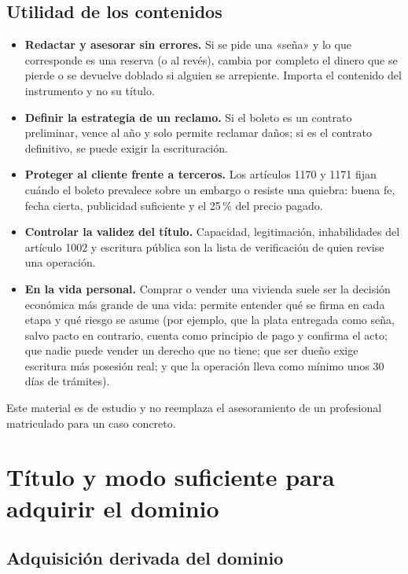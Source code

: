 \documentclass[12pt,oneside]{book}
\begin{document}
\section*{Utilidad de los contenidos}

\begin{itemize}
    \item \textbf{Redactar y asesorar sin errores.} Si se pide una «seña» y lo que corresponde es una reserva (o al revés), cambia por completo el dinero que se pierde o se devuelve doblado si alguien se arrepiente. Importa el contenido del instrumento y no su título.
    \item \textbf{Definir la estrategia de un reclamo.} Si el boleto es un contrato preliminar, vence al año y solo permite reclamar daños; si es el contrato definitivo, se puede exigir la escrituración.
    \item \textbf{Proteger al cliente frente a terceros.} Los artículos 1170 y 1171 fijan cuándo el boleto prevalece sobre un embargo o resiste una quiebra: buena fe, fecha cierta, publicidad suficiente y el 25\,\% del precio pagado.
    \item \textbf{Controlar la validez del título.} Capacidad, legitimación, inhabilidades del artículo 1002 y escritura pública son la lista de verificación de quien revise una operación.
    \item \textbf{En la vida personal.} Comprar o vender una vivienda suele ser la decisión económica más grande de una vida: permite entender qué se firma en cada etapa y qué riesgo se asume (por ejemplo, que la plata entregada como seña, salvo pacto en contrario, cuenta como principio de pago y confirma el acto; que nadie puede vender un derecho que no tiene; que ser dueño exige escritura más posesión real; y que la operación lleva como mínimo unos 30 días de trámites).
\end{itemize}

\begin{note}
Este material es de estudio y no reemplaza el asesoramiento de un profesional matriculado para un caso concreto.
\end{note}

\chapter[Título y modo suficiente]{Título y modo suficiente para adquirir el dominio}

\section{Adquisición derivada del dominio}
\end{document}
